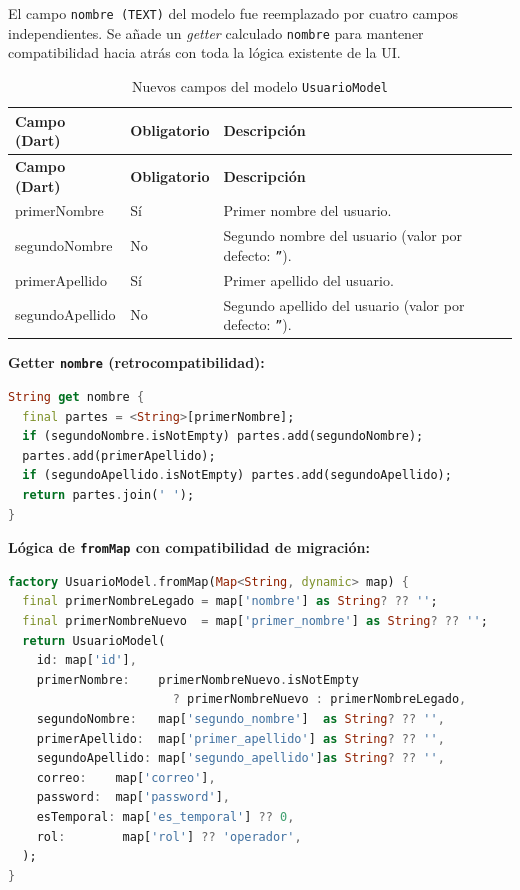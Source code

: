 \documentclass[12pt,a4paper]{article}
\begin{document}
El campo \texttt{nombre~(TEXT)} del modelo fue reemplazado por cuatro campos independientes.
Se añade un \emph{getter} calculado \texttt{nombre} para mantener compatibilidad hacia atrás
con toda la lógica existente de la UI.

\begin{longtable}{>{\ttfamily}p{4cm} p{2.5cm} p{7cm}}
\caption{Nuevos campos del modelo \texttt{UsuarioModel}} \label{tab:campos-modelo} \\
\toprule
\textbf{Campo (Dart)} & \textbf{Obligatorio} & \textbf{Descripción} \\
\midrule
\endfirsthead
\toprule
\textbf{Campo (Dart)} & \textbf{Obligatorio} & \textbf{Descripción} \\
\midrule
\endhead
\bottomrule
\endlastfoot
primerNombre   & Sí & Primer nombre del usuario. \\
segundoNombre  & No & Segundo nombre del usuario (valor por defecto: \texttt{''}). \\
primerApellido & Sí & Primer apellido del usuario. \\
segundoApellido& No & Segundo apellido del usuario (valor por defecto: \texttt{''}). \\
\end{longtable}

\textbf{Getter \texttt{nombre} (retrocompatibilidad):}
\begin{lstlisting}[language=Dart, caption={Getter calculado en UsuarioModel}]
String get nombre {
  final partes = <String>[primerNombre];
  if (segundoNombre.isNotEmpty) partes.add(segundoNombre);
  partes.add(primerApellido);
  if (segundoApellido.isNotEmpty) partes.add(segundoApellido);
  return partes.join(' ');
}
\end{lstlisting}

\textbf{Lógica de \texttt{fromMap} con compatibilidad de migración:}
\begin{lstlisting}[language=Dart, caption={Deserialización con soporte a datos legados}]
factory UsuarioModel.fromMap(Map<String, dynamic> map) {
  final primerNombreLegado = map['nombre'] as String? ?? '';
  final primerNombreNuevo  = map['primer_nombre'] as String? ?? '';
  return UsuarioModel(
    id: map['id'],
    primerNombre:    primerNombreNuevo.isNotEmpty
                       ? primerNombreNuevo : primerNombreLegado,
    segundoNombre:   map['segundo_nombre']  as String? ?? '',
    primerApellido:  map['primer_apellido'] as String? ?? '',
    segundoApellido: map['segundo_apellido']as String? ?? '',
    correo:    map['correo'],
    password:  map['password'],
    esTemporal: map['es_temporal'] ?? 0,
    rol:        map['rol'] ?? 'operador',
  );
}
\end{lstlisting}
\end{document}
